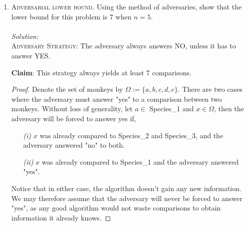 \documentclass[12pt]{article}
\theoremstyle{definition}
\theoremstyle{remark}
\newcommand\sol{%
  \\ 
  \\
  \textit{Solution:}\\%
}
\begin{document}
\begin{enumerate}
\begin{enumerate}
\begin{proof}
\end{proof}
     \item[\it (iii)] Using a decision tree-based method, show that the lower bound for this problem is 6 when $n = 5$.
     \begin{proof} 
      The algorithm outputs three sets of monkeys of identical species. For each monkey, there are three possibilities of species, hence $3^5$ total permutations. Yet, this accounts for the order of the species, which we don't care about. That is, it shouldn't matter whether the \textit{popa langurs} are grouped in Species\_1, Species\_2, or Species\_3. To remove this unwanted notion of order, we divide by $3!$. It follows that the total number of possible outputs for this problem is given by
    $$\frac{3^n}{3!} $$
       By part (ii), each leaf corresponds to a different output, so we have a tree with $\frac{3^n}{3!}$ leaves. Thus, by the method of decision trees, the lower bound is
    $$\left\lceil\log_{2}\left( \frac{3^5}{3!} \right)\right\rceil = 6$$

     \end{proof}
  \item[\it (iv)] For general $n,$ show that the decision tree lower bound is at least $an- b$ and at most $an + b$
    for $n \geq n_0$, for some positive numbers $a, b, n_0$. Determine suitable values for these numbers. Compare this with your answer in \textit{(i)} and conclude that the decision tree bound for this problem is rather weak.
    \sol 
     For a general $n,$ the number of leaves in the decision tree is upper bounded by $3^n$,  
  \end{enumerate}
  \newpage
  \item \textsc{Adversarial lower bound.} Using the method of adversaries, show that the lower bound for this problem is 7 when $n = 5$. 
  \sol 
  \textsc{Adversary Strategy:} The adversary always answers NO, unless it has to answer YES.

  \textbf{Claim}: This strategy always yields at least 7 comparisons.
  \begin{proof} 
    Denote the set of monkeys by $\Omega := \{a,b, c,d,e\}$. There are two cases where the adversary must answer "yes" to a comparison between two monkeys. Without loss of generality, let $a \in $ Species\_1 and $x\in \Omega$, then the adversary will be forced to answer yes if,
    \begin{enumerate}
      \item[\it (i)] $x$ was already compared to Species\_2 and Species\_3, and the adversary answered "no" to both.
      \item[\it (ii)] $x$ was already compared to Species\_1 and the adversary answered "yes". 
    \end{enumerate}
    Notice that in either case, the algorithm doesn't gain any new information. We may therefore assume that the adversary will never be forced to answer "yes", as any good algorithm would not waste comparisons to obtain information it already knows. 
    

\end{proof}
\end{enumerate}
\end{document}
